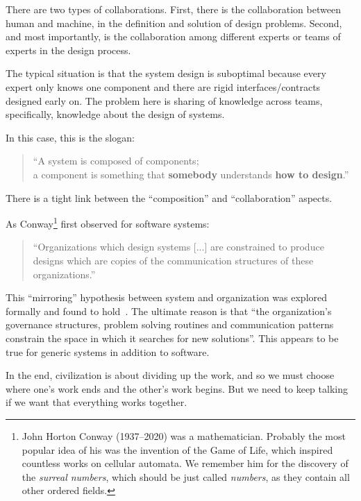 There are two types of collaborations. First, there is the collaboration  between human and machine, in the definition and solution of design problems. Second, and most importantly, is the collaboration among different experts or teams of experts in the design process.

The typical situation is that the system design is suboptimal because every expert only knows one component and there are rigid interfaces/contracts designed early on. The problem here is sharing of knowledge across teams, specifically, knowledge about the design of systems.

In this case, this is the slogan:

\begin{quote}
    \enquote{A system is composed of components;\\
      a component is something that \textbf{somebody} understands
      \textbf{how to design}.}
\end{quote}


There is a tight link between the ``composition'' and ``collaboration'' aspects.

As Conway\footnote{John Horton Conway (1937--2020) was a mathematician. Probably the most
popular idea of his was the invention of the Game of Life, which inspired countless
works on cellular automata. We remember him for the discovery of the \emph{surreal numbers},
which should be just called \emph{numbers}, as they contain all other ordered fields.} first observed for software systems:

\begin{quote}
\enquote{Organizations which design systems [...] are constrained to produce designs which are copies of the communication structures of these organizations.}
\end{quote}


This ``mirroring'' hypothesis between system and organization was explored formally and found to hold~\cite{maccormack12exploring}. The ultimate reason is that ``the organization's governance structures, problem solving routines and communication patterns constrain the space in which it searches for new solutions''. This appears to be true for generic systems in addition to software.


In the end, civilization is about dividing up the work, and so we must choose where one's work ends and the other's work begins. But we need to keep talking if we want that everything works together.


